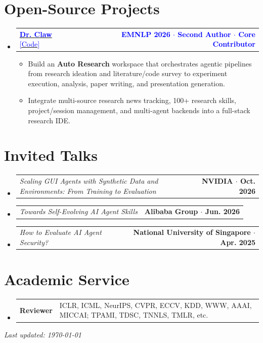 \documentclass[letterpaper,11pt]{article}
\makeatletter
\newcommand{\metric}[1]{{\setlength{\fboxsep}{1.2pt}\setlength{\fboxrule}{0.4pt}\fcolorbox{award!40}{award!8}{\scriptsize\upshape\bfseries\vphantom{Agy/()}\textcolor{award}{#1}}}}
\newcommand{\resumeItem}[1]{
  \item\small{
    {#1 \vspace{-2pt}}
  }
}
\newcommand{\honor}[2]{
  \vspace{-2pt}\item
    \begin{tabular*}{1.0\textwidth}[t]{l@{\extracolsep{\fill}}r}
      \small #1 & #2 \\
    \end{tabular*}\vspace{-12pt}
}
\newcommand{\honorLast}[2]{
  \vspace{-2pt}\item
    \begin{tabular*}{1.0\textwidth}[t]{l@{\extracolsep{\fill}}r}
      \small #1 & #2 \\
    \end{tabular*}\vspace{-5pt}
}
\newcommand{\serviceEntryLast}[2]{
  \vspace{-2pt}\item
    \begin{tabularx}{1.0\textwidth}[t]{@{}>{\small\bfseries\color{navy}}l@{\hspace{0.7em}}>{\small\raggedright\arraybackslash}X@{}}
      #1 & #2 \\
    \end{tabularx}\vspace{-3pt}
}
\newcommand{\resumeProjectHeading}[2]{
    \item
    \begin{tabular*}{1.001\textwidth}{l@{\extracolsep{\fill}}r}
      \small#1 & \textbf{\small #2}\\
    \end{tabular*}\vspace{-7pt}
}
\newcommand{\resumeSubHeadingListStart}{\begin{itemize}[leftmargin=0.0in, label={}]}
\newcommand{\resumeSubHeadingListEnd}{\end{itemize}}
\newcommand{\resumeItemListStart}{\begin{itemize}}
\newcommand{\resumeItemListEnd}{\end{itemize}\vspace{-5pt}}
\makeatother
\begin{document}
\section{Open-Source Projects}
  \resumeSubHeadingListStart
    \resumeProjectHeading
      {\href{https://openreview.net/forum?id=M30F2071sz}{\textcolor{blue}{\textbf{Dr. Claw}}} \href{https://github.com/OpenLAIR/dr-claw}{\textcolor{blue}{[Code]}} \metric{$\sim$1.2k GitHub stars $\cdot$ 130+ forks}}{\textcolor{blue}{EMNLP 2026 $\cdot$ Second Author $\cdot$ Core Contributor}}
      \resumeItemListStart
        \resumeItem{Build an \textbf{Auto Research} workspace that orchestrates agentic pipelines from research ideation and literature/code survey to experiment execution, analysis, paper writing, and presentation generation.}
        \resumeItem{Integrate multi-source research news tracking, 100+ research skills, project/session management, and multi-agent backends into a full-stack research IDE.}
      \resumeItemListEnd
  \resumeSubHeadingListEnd


\section{Invited Talks}
  \resumeSubHeadingListStart
    \honor {\textit{Scaling GUI Agents with Synthetic Data and Environments: From Training to Evaluation}}{\textbf{\small\textcolor{muted}{NVIDIA $\cdot$ Oct. 2026}}}
    \honor {\textit{Towards Self-Evolving AI Agent Skills}}{\textbf{\small\textcolor{muted}{Alibaba Group $\cdot$ Jun. 2026}}}
    \honorLast {\textit{How to Evaluate AI Agent Security?}}{\textbf{\small\textcolor{muted}{National University of Singapore $\cdot$ Apr. 2025}}}
  \resumeSubHeadingListEnd

\section{Academic Service}
  \resumeSubHeadingListStart
    \serviceEntryLast {Reviewer}{ICLR, ICML, NeurIPS, CVPR, ECCV, KDD, WWW, AAAI, MICCAI; TPAMI, TDSC, TNNLS, TMLR, etc.}
  \resumeSubHeadingListEnd



\vspace{4pt}
\begin{flushright}\scriptsize\textcolor{muted}{\textit{Last updated: \today}}\end{flushright}
\end{document}
